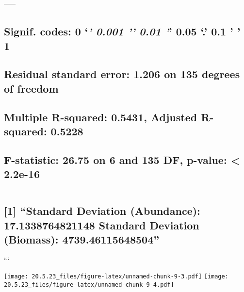 \documentclass[
]{article}
\begin{document}
\hypertarget{section-48}{%
\subsection{---}\label{section-48}}

\hypertarget{signif.-codes-0-0.001-0.01-0.05-.-0.1-1-2}{%
\subsection{\texorpdfstring{Signif. codes: 0 `\emph{\textbf{' 0.001 '}'
0.01 '}' 0.05 `.' 0.1 ' '
1}{Signif. codes: 0 `\,' 0.001 '\,' 0.01 '\,' 0.05 `.' 0.1 ' ' 1}}\label{signif.-codes-0-0.001-0.01-0.05-.-0.1-1-2}}

\hypertarget{section-49}{%
\subsection{}\label{section-49}}

\hypertarget{residual-standard-error-1.206-on-135-degrees-of-freedom}{%
\subsection{Residual standard error: 1.206 on 135 degrees of
freedom}\label{residual-standard-error-1.206-on-135-degrees-of-freedom}}

\hypertarget{multiple-r-squared-0.5431-adjusted-r-squared-0.5228}{%
\subsection{Multiple R-squared: 0.5431, Adjusted R-squared:
0.5228}\label{multiple-r-squared-0.5431-adjusted-r-squared-0.5228}}

\hypertarget{f-statistic-26.75-on-6-and-135-df-p-value-2.2e-16}{%
\subsection{F-statistic: 26.75 on 6 and 135 DF, p-value: \textless{}
2.2e-16}\label{f-statistic-26.75-on-6-and-135-df-p-value-2.2e-16}}

\begin{verbatim}
\end{verbatim}

\hypertarget{standard-deviation-abundance-17.1338764821148-standard-deviation-biomass-4739.46115648504}{%
\subsection{{[}1{]} ``Standard Deviation (Abundance): 17.1338764821148
Standard Deviation (Biomass):
4739.46115648504''}\label{standard-deviation-abundance-17.1338764821148-standard-deviation-biomass-4739.46115648504}}

```

\texttt{[image: 20.5.23\_files/figure-latex/unnamed-chunk-9-3.pdf]}
\texttt{[image: 20.5.23\_files/figure-latex/unnamed-chunk-9-4.pdf]}
\end{document}
